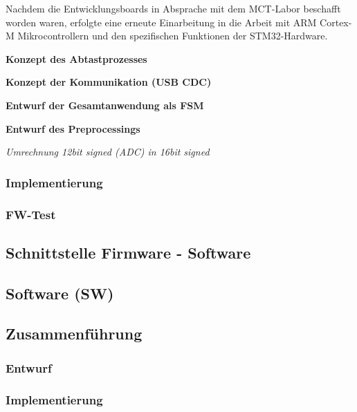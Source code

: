 \documentclass[a4paper, portrait, 12pt]{scrartcl} %
\begin{document}
Nachdem die Entwicklungsboards in Absprache mit dem MCT-Labor beschafft worden waren, erfolgte eine erneute Einarbeitung in die Arbeit mit ARM Cortex-M Mikrocontrollern und den spezifischen Funktionen der STM32-Hardware.
\pagebreak

\textbf{Konzept des Abtastprozesses}\\

\pagebreak

\textbf{Konzept der Kommunikation (USB CDC)}\\

\pagebreak

\textbf{Entwurf der Gesamtanwendung als FSM}\\

\pagebreak


\textbf{Entwurf des Preprocessings}

\emph{Umrechnung 12bit signed (ADC) in 16bit signed}

\subsubsection{Implementierung}

\pagebreak

\subsubsection{FW-Test}

\pagebreak

\subsection{Schnittstelle Firmware - Software}

\pagebreak

\subsection{Software (SW)}

\subsection{Zusammenführung}
\subsubsection{Entwurf}
\subsubsection{Implementierung}
\end{document}
